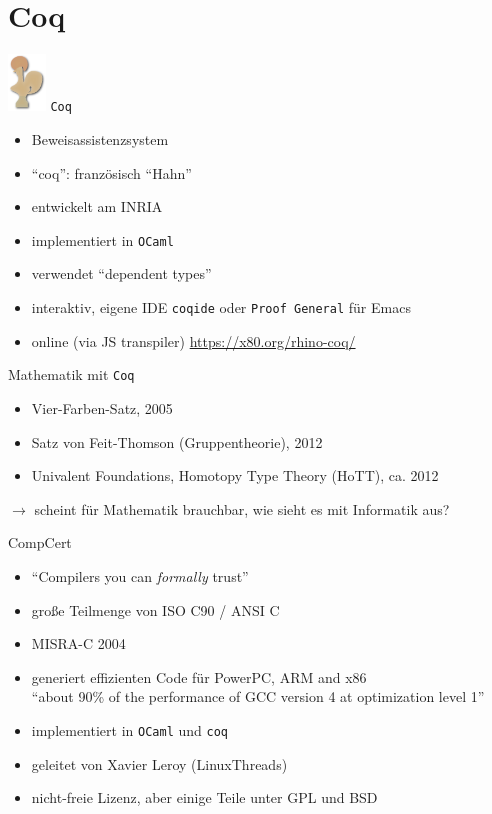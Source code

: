 \documentclass[aspectratio=169]{beamer}
\begin{document}
\section{Coq}
\begin{frame}
  \begin{center}
    \includegraphics[width=1.0cm]{coq_logo.png}
    \Large{\texttt{Coq}}
  \end{center}
  \begin{itemize}
  \item Beweisassistenzsystem
  \item ``coq'': französisch ``Hahn''
  \item entwickelt am INRIA
  \item implementiert in \texttt{OCaml}
  \item verwendet ``dependent types''
  \item interaktiv, eigene IDE \texttt{coqide} oder \texttt{Proof General} für Emacs
  \item online (via JS transpiler) \url{https://x80.org/rhino-coq/}
  \end{itemize}
\end{frame}
\begin{frame}
  \begin{center}
    \Large{Mathematik mit \texttt{Coq}}
  \end{center}
  \begin{itemize}
  \item Vier-Farben-Satz, 2005
  \item Satz von Feit-Thomson (Gruppentheorie), 2012
  \item Univalent Foundations, Homotopy Type Theory (HoTT), ca. 2012
  \end{itemize}
  \pause
  \vfill
  \begin{center}  
    $\rightarrow$ scheint für Mathematik brauchbar, wie sieht es mit Informatik aus?
  \end{center}
\end{frame}
\begin{frame}
  \begin{center}
    \Large{CompCert}
  \end{center}
  \begin{itemize}
  \item ``Compilers you can \textit{formally} trust''
  \item große Teilmenge von ISO C90 / ANSI C
  \item MISRA-C 2004
  \item generiert effizienten Code für PowerPC, ARM and x86\\
    ``about 90\% of the performance of GCC version 4 at optimization level 1''
  \item implementiert in \texttt{OCaml} und \texttt{coq}
  \item geleitet von Xavier Leroy (LinuxThreads) 
  \item nicht-freie Lizenz, aber einige Teile unter GPL und BSD
  \end{itemize}
\end{frame}
\end{document}
